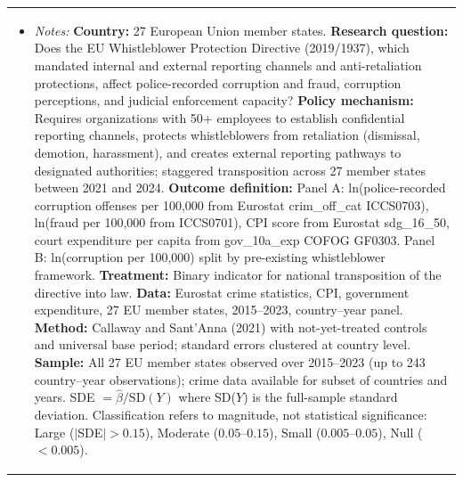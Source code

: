 \begin{table}[htbp]
\begin{tabular}{lcccccc}
\multicolumn{7}{p{0.95\textwidth}}{\footnotesize \begin{itemize}[leftmargin=*,nosep] \item \textit{Notes:} \textbf{Country:} 27 European Union member states. \textbf{Research question:} Does the EU Whistleblower Protection Directive (2019/1937), which mandated internal and external reporting channels and anti-retaliation protections, affect police-recorded corruption and fraud, corruption perceptions, and judicial enforcement capacity? \textbf{Policy mechanism:} Requires organizations with 50+ employees to establish confidential reporting channels, protects whistleblowers from retaliation (dismissal, demotion, harassment), and creates external reporting pathways to designated authorities; staggered transposition across 27 member states between 2021 and 2024. \textbf{Outcome definition:} Panel A: ln(police-recorded corruption offenses per 100,000 from Eurostat crim\_off\_cat ICCS0703), ln(fraud per 100,000 from ICCS0701), CPI score from Eurostat sdg\_16\_50, court expenditure per capita from gov\_10a\_exp COFOG GF0303. Panel B: ln(corruption per 100,000) split by pre-existing whistleblower framework. \textbf{Treatment:} Binary indicator for national transposition of the directive into law. \textbf{Data:} Eurostat crime statistics, CPI, government expenditure, 27 EU member states, 2015--2023, country--year panel. \textbf{Method:} Callaway and Sant'Anna (2021) with not-yet-treated controls and universal base period; standard errors clustered at country level. \textbf{Sample:} All 27 EU member states observed over 2015--2023 (up to 243 country--year observations); crime data available for subset of countries and years. SDE $= \hat{\beta} / \text{SD}(Y)$ where SD($Y$) is the full-sample standard deviation. Classification refers to magnitude, not statistical significance: Large ($|$SDE$| > 0.15$), Moderate ($0.05$--$0.15$), Small ($0.005$--$0.05$), Null ($< 0.005$). \end{itemize}} \\
\end{tabular}
\end{table}
